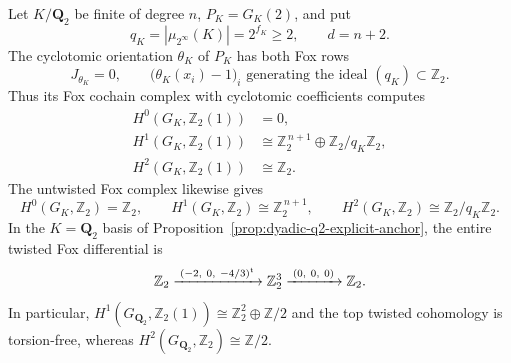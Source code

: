 \begin{theorem}
\label{thm:dyadic-fox-kummer-tate}
Let $K/\mathbf Q_2$ be finite of degree $n$,
$P_K=G_K(2)$, and put
\[
q_K=|\mu_{2^\infty}(K)|=2^{f_K}\ge2,
\qquad d=n+2.
\]
The cyclotomic orientation $\theta_K$ of $P_K$
has both Fox rows
\begin{equation}\label{eq:dyadic-kummer-fox-rows}
J_{\theta_K}=0,\qquad
\bigl(\theta_K(x_i)-1\bigr)_i
\text{ generating the ideal }(q_K)\subset\mathbb Z_2.
\end{equation}
Thus its Fox cochain complex with cyclotomic
coefficients computes
\begin{equation}\label{eq:dyadic-kummer-tate-groups}
\boxed{
\begin{aligned}
H^0(G_K,\mathbb Z_2(1))&=0,\\
H^1(G_K,\mathbb Z_2(1))
  &\cong\mathbb Z_2^{\,n+1}
     \oplus\mathbb Z_2/q_K\mathbb Z_2,\\
H^2(G_K,\mathbb Z_2(1))&\cong\mathbb Z_2.
\end{aligned}}
\end{equation}
The untwisted Fox complex likewise gives
\begin{equation}\label{eq:dyadic-untwisted-tate-groups}
H^0(G_K,\mathbb Z_2)=\mathbb Z_2,\qquad
H^1(G_K,\mathbb Z_2)\cong\mathbb Z_2^{\,n+1},\qquad
H^2(G_K,\mathbb Z_2)\cong
   \mathbb Z_2/q_K\mathbb Z_2.
\end{equation}
In the $K=\mathbf Q_2$ basis of
Proposition~\ref{prop:dyadic-q2-explicit-anchor},
the entire twisted Fox differential is
\begin{equation}\label{eq:dyadic-q2-twisted-complex}
\mathbb Z_2
\xrightarrow{\;(-2,\ 0,\ -4/3)^{\rm t}\;}
\mathbb Z_2^3
\xrightarrow{\;(0,\ 0,\ 0)\;}
\mathbb Z_2.
\end{equation}
In particular,
$H^1(G_{\mathbf Q_2},\mathbb Z_2(1))
\cong\mathbb Z_2^2\oplus\mathbb Z/2$
and the top twisted cohomology is torsion-free,
whereas
$H^2(G_{\mathbf Q_2},\mathbb Z_2)
\cong\mathbb Z/2$.
\end{theorem}

